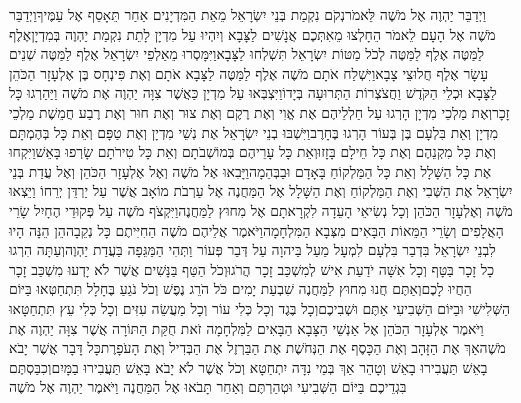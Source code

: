\documentclass[../main/main.tex]{subfiles}
\begin{document}
\begin{multicols}{\ncols}
וַיְדַבֵּר יַהְוֶה אֶל מֹשֶׁה לֵּאמֹר\PreVerseSpace{}נְקֹם נִקְמַת בְּנֵי יִשְׂרָאֵל מֵאֵת הַמִּדְיָנִים אַחַר תֵּאָסֵף אֶל עַמֶּיךָ\PreVerseSpace{}וַיְדַבֵּר מֹשֶׁה אֶל הָעָם לֵאמֹר הֵחָלְצוּ מֵאִתְּכֶם אֲנָשִׁים לַצָּבָא וְיִהְיוּ עַל מִדְיָן לָתֵת נִקְמַת יַהְוֶה בְּמִדְיָן\PreVerseSpace{}אֶלֶף לַמַּטֶּה אֶלֶף לַמַּטֶּה לְכֹל מַטּוֹת יִשְׂרָאֵל תִּשְׁלְחוּ לַצָּבָא\PreVerseSpace{}וַיִּמָּסְרוּ מֵאַלְפֵי יִשְׂרָאֵל אֶלֶף לַמַּטֶּה שְׁנֵים עָשָׂר אֶלֶף חֲלוּצֵי צָבָא\PreVerseSpace{}וַיִּשְׁלַח אֹתָם מֹשֶׁה אֶלֶף לַמַּטֶּה לַצָּבָא אֹתָם וְאֶת פִּינְחָס בֶּן אֶלְעָזָר הַכֹּהֵן לַצָּבָא וּכְלֵי הַקֹּדֶשׁ וַחֲצֹצְרוֹת הַתְּרוּעָה בְּיָדוֹ\PreVerseSpace{}וַיִּצְבְּאוּ עַל מִדְיָן כַּאֲשֶׁר צִוָּה יַהְוֶה אֶת מֹשֶׁה וַיַּהַרְגוּ כָּל זָכָר\PreVerseSpace{}וְאֶת מַלְכֵי מִדְיָן הָרְגוּ עַל חַלְלֵיהֶם אֶת אֱוִי וְאֶת רֶקֶם וְאֶת צוּר וְאֶת חוּר וְאֶת רֶבַע חֲמֵשֶׁת מַלְכֵי מִדְיָן וְאֵת בִּלְעָם בֶּן בְּעוֹר הָרְגוּ בֶּחָרֶב\PreVerseSpace{}וַיִּשְׁבּוּ בְנֵי יִשְׂרָאֵל אֶת נְשֵׁי מִדְיָן וְאֶת טַפָּם וְאֵת כָּל בְּהֶמְתָּם וְאֶת כָּל מִקְנֵהֶם וְאֶת כָּל חֵילָם בָּזָזוּ\PreVerseSpace{}וְאֵת כָּל עָרֵיהֶם בְּמוֹשְׁבֹתָם וְאֵת כָּל טִירֹתָם שָׂרְפוּ בָּאֵשׁ\PreVerseSpace{}וַיִּקְחוּ אֶת כָּל הַשָּׁלָל וְאֵת כָּל הַמַּלְקוֹחַ בָּאָדָם וּבַבְּהֵמָה\PreVerseSpace{}וַיָּבִאוּ אֶל מֹשֶׁה וְאֶל אֶלְעָזָר הַכֹּהֵן וְאֶל עֲדַת בְּנֵי יִשְׂרָאֵל אֶת הַשְּׁבִי וְאֶת הַמַּלְקוֹחַ וְאֶת הַשָּׁלָל אֶל הַמַּחֲנֶה אֶל עַרְבֹת מוֹאָב אֲשֶׁר עַל יַרְדֵּן יְרֵחוֹ \ClosedSection{}וַיֵּצְאוּ מֹשֶׁה וְאֶלְעָזָר הַכֹּהֵן וְכָל נְשִׂיאֵי הָעֵדָה לִקְרָאתָם אֶל מִחוּץ לַמַּחֲנֶה\PreVerseSpace{}וַיִּקְצֹף מֹשֶׁה עַל פְּקוּדֵי הֶחָיִל שָׂרֵי הָאֲלָפִים וְשָׂרֵי הַמֵּאוֹת הַבָּאִים מִצְּבָא הַמִּלְחָמָה\PreVerseSpace{}וַיֹּאמֶר אֲלֵיהֶם מֹשֶׁה הַחִיִּיתֶם כָּל נְקֵבָה\PreVerseSpace{}הֵן הֵנָּה הָיוּ לִבְנֵי יִשְׂרָאֵל בִּדְבַר בִּלְעָם לִמְעָל\SubEnd{} מַעַל בַּיהוָה עַל דְּבַר פְּעוֹר וַתְּהִי הַמַּגֵּפָה בַּעֲדַת יַהְוֶה\PreVerseSpace{}וְעַתָּה הִרְגוּ כָל זָכָר בַּטָּף וְכָל אִשָּׁה יֹדַעַת אִישׁ לְמִשְׁכַּב זָכָר הֲרֹגוּ\PreVerseSpace{}וְכֹל הַטַּף בַּנָּשִׁים אֲשֶׁר לֹא יָדְעוּ מִשְׁכַּב זָכָר הַחֲיוּ לָכֶם\PreVerseSpace{}וְאַתֶּם חֲנוּ מִחוּץ לַמַּחֲנֶה שִׁבְעַת יָמִים כֹּל הֹרֵג נֶפֶשׁ וְכֹל נֹגֵעַ בֶּחָלָל תִּתְחַטְּאוּ בַּיּוֹם הַשְּׁלִישִׁי וּבַיּוֹם הַשְּׁבִיעִי אַתֶּם וּשְׁבִיכֶם\PreVerseSpace{}וְכָל בֶּגֶד וְכָל כְּלִי עוֹר וְכָל מַעֲשֵׂה עִזִּים וְכָל כְּלִי עֵץ תִּתְחַטָּאוּ \ClosedSection{}וַיֹּאמֶר אֶלְעָזָר הַכֹּהֵן אֶל אַנְשֵׁי הַצָּבָא הַבָּאִים לַמִּלְחָמָה זֹאת חֻקַּת הַתּוֹרָה אֲשֶׁר צִוָּה יַהְוֶה אֶת מֹשֶׁה\PreVerseSpace{}אַךְ אֶת הַזָּהָב וְאֶת הַכָּסֶף אֶת הַנְּחֹשֶׁת אֶת הַבַּרְזֶל אֶת הַבְּדִיל וְאֶת הָעֹפָרֶת\PreVerseSpace{}כָּל דָּבָר אֲשֶׁר יָבֹא בָאֵשׁ תַּעֲבִירוּ בָאֵשׁ וְטָהֵר אַךְ בְּמֵי נִדָּה יִתְחַטָּא וְכֹל אֲשֶׁר לֹא יָבֹא בָּאֵשׁ תַּעֲבִירוּ בַמָּיִם\PreVerseSpace{}וְכִבַּסְתֶּם בִּגְדֵיכֶם בַּיּוֹם הַשְּׁבִיעִי וּטְהַרְתֶּם וְאַחַר תָּבֹאוּ אֶל הַמַּחֲנֶה \ClosedSection{}וַיֹּאמֶר יַהְוֶה אֶל מֹשֶׁה 
\end{multicols}
\end{document}
